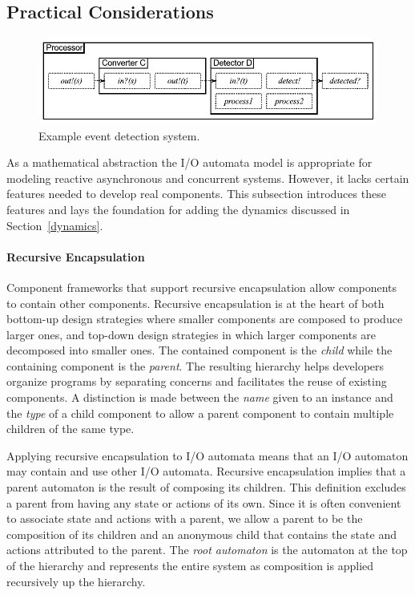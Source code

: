 \subsection{Practical Considerations\label{practical}}

\begin{figure}
\center
\includegraphics[width=\columnwidth]{system_model}
\caption{Example event detection system.}
\label{sys_model}
\end{figure}

As a mathematical abstraction the I/O automata model is appropriate for modeling reactive asynchronous and concurrent systems.
However, it lacks certain features needed to develop real components.
This subsection introduces these features and lays the foundation for adding the dynamics discussed in Section~\ref{dynamics}.

\paragraph*{Recursive Encapsulation}
Component frameworks that support recursive encapsulation allow components to contain other components.
Recursive encapsulation is at the heart of both bottom-up design strategies where smaller components are composed to produce larger ones, and top-down design strategies in which larger components are decomposed into smaller ones.
The contained component is the \emph{child} while the containing component is the \emph{parent}.
The resulting hierarchy helps developers organize programs by separating concerns and facilitates the reuse of existing components.
A distinction is made between the \emph{name} given to an instance and the \emph{type} of a child component to allow a parent component to contain multiple children of the same type.

Applying recursive encapsulation to I/O automata means that an I/O automaton may contain and use other I/O automata.
Recursive encapsulation implies that a parent automaton is the result of composing its children.
This definition excludes a parent from having any state or actions of its own.
Since it is often convenient to associate state and actions with a parent, we allow a parent to be the composition of its children and an anonymous child that contains the state and actions attributed to the parent.
The \emph{root automaton} is the automaton at the top of the hierarchy and represents the entire system as composition is applied recursively up the hierarchy.

